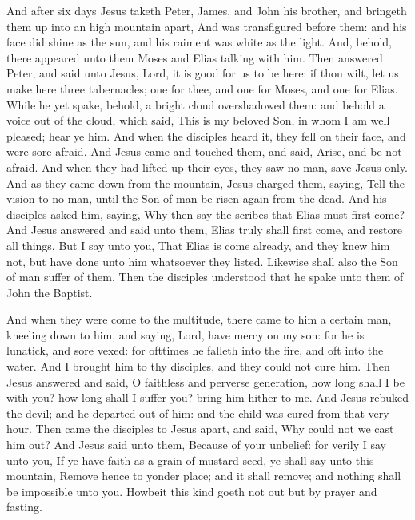  And after six days Jesus taketh Peter, James, and John
his brother, and bringeth them up into an high mountain apart,
 And was transfigured before them: and his face did shine
as the sun, and his raiment was white as the light.  And,
behold, there appeared unto them Moses and Elias talking with him.
 Then answered Peter, and said unto Jesus, Lord, it is
good for us to be here: if thou wilt, let us make here three
tabernacles; one for thee, and one for Moses, and one for Elias.
 While he yet spake, behold, a bright cloud overshadowed
them: and behold a voice out of the cloud, which said, This is my
beloved Son, in whom I am well pleased; hear ye him.  And
when the disciples heard it, they fell on their face, and were sore
afraid.  And Jesus came and touched them, and said, Arise,
and be not afraid.  And when they had lifted up their
eyes, they saw no man, save Jesus only.  And as they came
down from the mountain, Jesus charged them, saying, Tell the vision to
no man, until the Son of man be risen again from the dead.
 And his disciples asked him, saying, Why then say the
scribes that Elias must first come?  And Jesus answered
and said unto them, Elias truly shall first come, and restore all
things.  But I say unto you, That Elias is come already,
and they knew him not, but have done unto him whatsoever they listed.
Likewise shall also the Son of man suffer of them.  Then
the disciples understood that he spake unto them of John the Baptist.

 And when they were come to the multitude, there came to
him a certain man, kneeling down to him, and saying, 
Lord, have mercy on my son: for he is lunatick, and sore vexed: for
ofttimes he falleth into the fire, and oft into the water.
 And I brought him to thy disciples, and they could not
cure him.  Then Jesus answered and said, O faithless and
perverse generation, how long shall I be with you? how long shall I
suffer you? bring him hither to me.  And Jesus rebuked
the devil; and he departed out of him: and the child was cured from that
very hour.  Then came the disciples to Jesus apart, and
said, Why could not we cast him out?  And Jesus said unto
them, Because of your unbelief: for verily I say unto you, If ye have
faith as a grain of mustard seed, ye shall say unto this mountain,
Remove hence to yonder place; and it shall remove; and nothing shall be
impossible unto you.  Howbeit this kind goeth not out but
by prayer and fasting.

